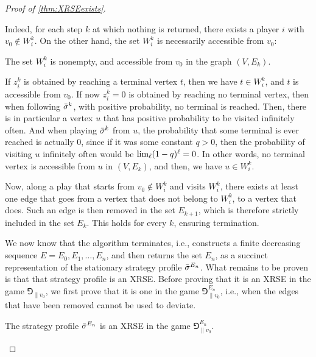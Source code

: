 \begin{proof}[Proof of \cref{thm:XRSEexists}]
\begin{claimproof}
    Indeed, for each step $k$ at which nothing is returned, there exists a player $i$ with $v_0 \not\in W_i^k$.
    On the other hand, the set $W_i^k$ is necessarily accessible from $v_0$:

    \begin{claim}
        The set $W_i^k$ is nonempty, and accessible from $v_0$ in the graph $(V, E_k)$.
    \end{claim}

    \begin{claimproof}
        If $z^k_i$ is obtained by reaching a terminal vertex $t$, then we have $t \in W_i^k$, and $t$ is accessible from $v_0$.
        If now $z^k_i = 0$ is obtained by reaching no terminal vertex, then when following ${\bar{\sigma}}^k$, with positive probability, no terminal is reached.
        Then, there is in particular a vertex $u$ that has positive probability to be visited infinitely often.
        And when playing ${\bar{\sigma}}^k$ from $u$, the probability that some terminal is ever reached is actually $0$, since if it was some constant $q > 0$, then the probability of visiting $u$ infinitely often would be $\lim_\ell (1-q)^\ell = 0$.
        In other words, no terminal vertex is accessible from $u$ in $(V, E_k)$, and then, we have $u \in W_i^k$.
    \end{claimproof}

    Now, along a play that starts from $v_0 \not\in W_i^k$ and visits $W_i^k$, there exists at least one edge that goes from a vertex that does not belong to $W_i^k$, to a vertex that does.
    Such an edge is then removed in the set $E_{k+1}$, which is therefore strictly included in the set $E_k$.
    This holds for every $k$, ensuring termination.
\end{claimproof}

We now know that the algorithm terminates, i.e., constructs a finite decreasing sequence $E = E_0, E_1, \dots, E_n$, and then returns the set $E_n$, as a succinct representation of the stationary strategy profile ${\bar{\sigma}}^{E_n}$.
What remains to be proven is that that strategy profile is an XRSE.
Before proving that it is an XRSE in the game $\Game_{\|v_0}$, we first prove that it is one in the game $\Game^{E_n}_{\|v_0}$, i.e., when the edges that have been removed cannot be used to deviate.

\begin{proposition}\label{prop:xrseGEn}
    The strategy profile ${\bar{\sigma}}^{E_n}$ is an XRSE in the game $\Game^{E_n}_{\|v_0}$.
\end{proposition}


\end{proof}
